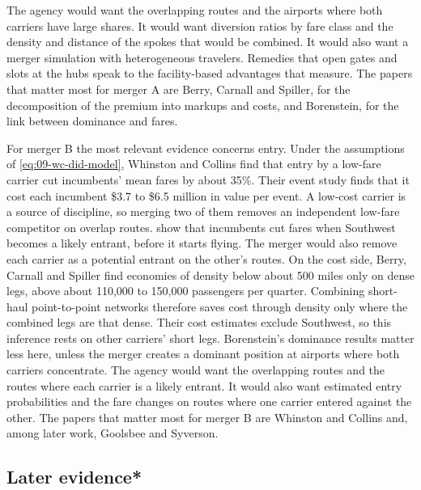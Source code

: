 The agency would want the overlapping routes and the airports where both carriers have large shares. It
would want diversion ratios by fare class and the density and distance of the spokes that would be combined.
It would also want a merger simulation with heterogeneous travelers. Remedies that open gates and slots at the hubs speak to the
facility-based advantages that \citet{CilibertoWilliams2010} measure. The papers that matter most for merger A
are Berry, Carnall and Spiller, for the decomposition of the premium into markups and costs, and Borenstein,
for the link between dominance and fares.

For merger B the most relevant evidence concerns entry. Under the assumptions of \eqref{eq:09-wc-did-model},
Whinston and Collins find that entry by a low-fare carrier cut incumbents' mean fares by about 35\%. Their
event study finds that it cost each incumbent \$3.7 to \$6.5 million in value per event. A low-cost carrier is a source of discipline, so merging two of them removes an independent low-fare
competitor on overlap routes. \citet{GoolsbeeSyverson2008} show that incumbents cut fares when Southwest
becomes a likely entrant, before it starts flying. The merger would also remove each carrier as a potential
entrant on the other's routes. On the cost side, Berry, Carnall and Spiller find economies of density below
about 500 miles only on dense legs, above about 110,000 to 150,000 passengers per quarter. Combining
short-haul point-to-point networks therefore saves cost through density only where the combined legs are that
dense.
Their cost estimates exclude Southwest, so this inference rests on other carriers' short legs. Borenstein's
dominance results matter less here, unless the merger creates a dominant position at airports where both
carriers concentrate. The agency would want the overlapping routes and the routes where each carrier is a
likely entrant. It would also want estimated entry probabilities and the fare changes on routes where one
carrier entered against the other. The papers that matter most for merger B are Whinston and Collins and, among later work, Goolsbee and
Syverson.

\subsection{Later evidence*}\label{sec:09-synthesis-later}

